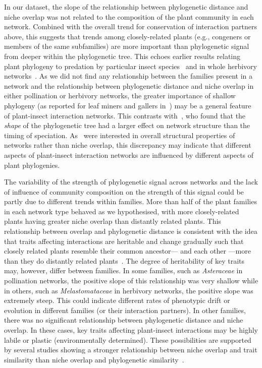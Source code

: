 \documentclass[12pt]{article}
\begin{document}
\begin{spacing}{1.5}
  In our dataset, the slope of the relationship between phylogenetic
  distance and niche overlap was not related to the composition of the
  plant community in each network. Combined with the overall trend for
  conservation of interaction partners above, this suggests that  
  trends among closely-related plants
  (e.g., congeners or members of the same subfamilies) are more
  important than phylogenetic signal from deeper within the phylogenetic
  tree. This echoes earlier results relating plant phylogeny to 
  predation by particular insect species~\citep{Novotny2002,Novotny2004,
  Odegaard2005} and in whole herbivory networks~\citep{Volf2017}. As
  we did not find any relationship between the families present in
  a network and the relationship between phylogenetic distance and
  niche overlap in either pollination or herbivory networks,
  the greater importance of shallow phylogeny (as reported for leaf
  miners and gallers in~\citet{Volf2017}) may be a general 
  feature of plant-insect interaction networks. This contrasts 
  with~\citet{Chamberlain2014}, who found that the \emph{shape}
  of the phylogenetic tree had a larger effect on network 
  structure than the timing of speciation. As~\citet{Chamberlain2014}
  were interested in overall structural properties of networks rather
  than niche overlap, this discrepancy may indicate that
  different aspects of plant-insect interaction networks are influenced
  by different aspects of plant phylogenies.


  The variability of the strength of phylogenetic signal across networks 
  and the lack of influence of community composition on the strength of 
  this signal could be partly due to different trends within families. 
  More than half of the plant families in each network type
  behaved as we hypothesised, with more 
  closely-related plants having greater niche overlap than 
  distantly related plants. This relationship between overlap and 
  phylogenetic distance is consistent with the idea that traits affecting 
  interactions are heritable and change gradually
  such that closely related plants resemble their common ancestor--- and
  each other ---more than they do distantly related 
  plants~\citep{Schemske1999,Gilbert2015,Ponisio2017}. The degree of 
  heritability of key traits may, however, differ between families. In
  some families, such as \emph{Asteraceae} in pollination networks, 
  the positive slope of this relationship was very shallow while in 
  others, such as \emph{Melastomataceae} in herbivory networks, the 
  positive slope was extremely steep. This could indicate different 
  rates of phenotypic drift or evolution in different families (or their interaction partners). 
  In other families, there was no significant relationship between phylogenetic
  distance and niche overlap. In these cases, key traits affecting 
  plant-insect interactions may be highly labile or plastic (environmentally determined). These possibilities are supported by several studies showing a stronger relationship between niche overlap and trait similarity than niche overlap and phylogenetic similarity~\citep{Junker2015,Ibanez2016,Endara2017}. 



\end{spacing}
\end{document}
